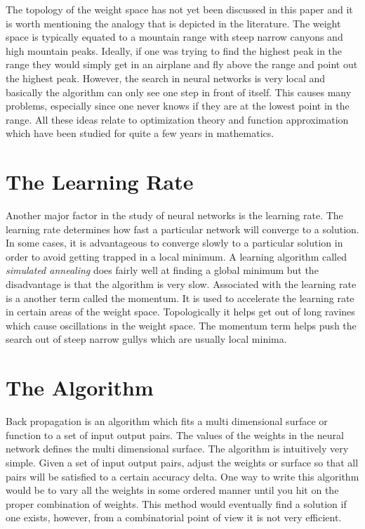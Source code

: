 	The topology of the weight space has not yet been discussed in
this paper and it is worth mentioning the analogy that is depicted in
the literature.  The weight space is typically equated to a mountain
range with steep narrow canyons and high mountain peaks.  Ideally, if
one was trying to find the highest peak in the range they would simply
get in an airplane and fly above the range and point out the highest
peak.  However, the search in neural networks is very local and
basically the algorithm can only see one step in front of itself.
This causes many problems, especially since one never knows if they
are at the lowest point in the range.  All these ideas relate to
optimization theory and function approximation which have been studied
for quite a few years in mathematics.
   
\section{The Learning Rate}
   
	Another major factor in the study of neural networks is the
learning rate.  The learning rate determines how fast a particular
network will converge to a solution.  In some cases, it is
advantageous to converge slowly to a particular solution in order to
avoid getting trapped in a local minimum.  A learning algorithm called
{\it simulated annealing} does fairly well at finding a global minimum
but the disadvantage is that the algorithm is very slow.  Associated
with the learning rate is a another term called the momentum.  It is
used to accelerate the learning rate in certain areas of the weight
space.  Topologically it helps get out of long ravines which cause
oscillations in the weight space.  The momentum term helps push the
search out of steep narrow gullys which are usually local minima.

\section{The Algorithm}

	Back propagation is an algorithm which fits a multi
dimensional surface or function to a set of input output pairs.  The
values of the weights in the neural network defines the multi
dimensional surface.  The algorithm is intuitively very simple.  Given
a set of input output pairs, adjust the weights or surface so that all
pairs will be satisfied to a certain accuracy delta.  One way to write
this algorithm would be to vary all the weights in some ordered manner
until you hit on the proper combination of weights.  This method would
eventually find a solution if one exists, however, from a
combinatorial point of view it is not very efficient.

